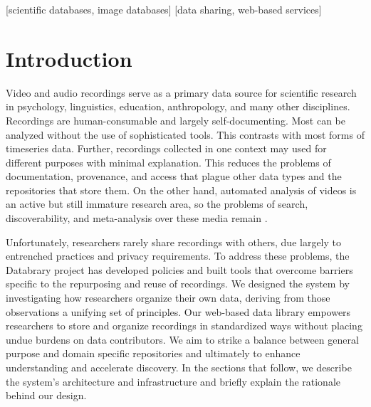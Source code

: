 \documentclass{sig-alternate}
\begin{document}
[scientific databases, image databases]
[data sharing, web-based services]



\section{Introduction}

Video and audio recordings serve as a primary data source for scientific research in psychology, linguistics, education, anthropology, and many other disciplines.
Recordings are human-consumable and largely self-documenting. 
Most can be analyzed without the use of sophisticated tools. 
This contrasts with most forms of timeseries data.
Further, recordings collected in one context may used for different purposes with minimal explanation.
This reduces the problems of documentation, provenance, and access that plague other data types and the repositories that store them. 
On the other hand, automated analysis of videos is an active but still immature research area, so the problems of search, discoverability, and meta-analysis over these media remain \cite{Albertson_2013, Lanagan_Smeaton_2012}.

Unfortunately, researchers rarely share recordings with others, due largely to entrenched practices and privacy requirements.
To address these problems, the Databrary project has developed policies and built tools that overcome barriers specific to the repurposing and reuse of recordings.
We designed the system by investigating how researchers organize their own data, deriving from those observations a unifying set of principles.
Our web-based data library empowers researchers to store and organize recordings in standardized ways without placing undue burdens on data contributors. 
We aim to strike a balance between general purpose and domain specific repositories and ultimately to enhance understanding and accelerate discovery.
In the sections that follow, we describe the system's architecture and infrastructure and briefly explain the rationale behind our design.
\end{document}
